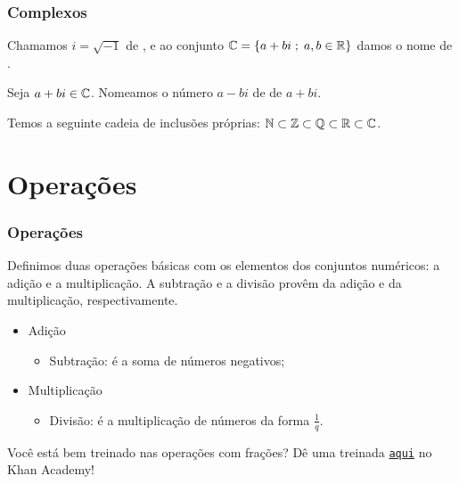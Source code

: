 \documentclass[brazil, notheorems, 10pt]{beamer}
\begin{document}
\begin{frame}
\frametitle{Complexos} %
\begin{Def}
Chamamos $i = \sqrt {-1}$ de , e ao conjunto
$\mathbb{C} = \left\{ a+bi \;;\; a,b \in \mathbb{R}\right\}$ damos o nome de .
\end{Def}

Seja $a+bi \in \mathbb{C}$. Nomeamos o número $a-bi$ de  de
$a+bi$.

Temos a seguinte cadeia de inclusões próprias: $\mathbb{N} \subset \mathbb{Z}
\subset \mathbb{Q} \subset \mathbb{R} \subset \mathbb{C}$.
\end{frame}



\section{Operações}
\begin{frame}
\frametitle{Operações} %
Definimos duas operações básicas com os elementos dos conjuntos
numéricos: a adição e a multiplicação. A subtração e a divisão
provêm da adição e da multiplicação, respectivamente.
\begin{itemize}
  \item Adição
    \begin{itemize}
    \item Subtração: é a soma de números negativos;
    \end{itemize}
  \item Multiplicação
    \begin{itemize}
    \item Divisão: é a multiplicação de números da forma $\frac 1
    q$.
    \end{itemize}
\end{itemize}

Você está bem treinado nas operações com frações? Dê uma treinada
\href{https://pt.khanacademy.org/math/arithmetic-home/arith-review-fractions}
{{\tt aqui}} no Khan Academy!
\end{frame}



\end{document}
